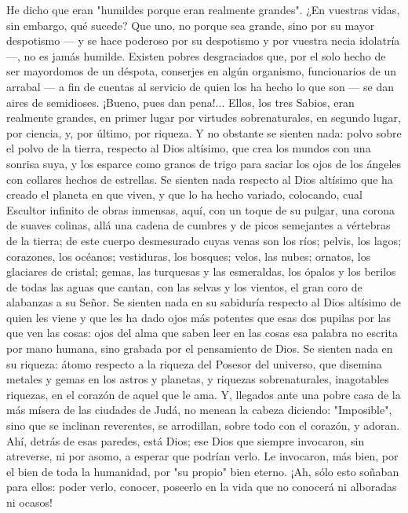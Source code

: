 \documentclass[12pt]{book} %
\begin{document}
He dicho que eran "humildes porque eran realmente grandes". ¿En vuestras vidas, sin embargo, qué sucede? Que uno, no porque sea grande, sino por su mayor despotismo — y se hace poderoso por su despotismo y por vuestra necia idolatría —, no es jamás humilde. Existen pobres desgraciados que, por el solo hecho de ser mayordomos de un déspota, conserjes en algún organismo, funcionarios de un arrabal — a fin de cuentas al servicio de quien los ha hecho lo que son — se dan aires de semidioses. ¡Bueno, pues dan pena!... 
Ellos, los tres Sabios, eran realmente grandes, en primer lugar por virtudes sobrenaturales, en segundo lugar, por 
ciencia, y, por último, por riqueza. Y no obstante se sienten nada: polvo sobre el polvo de la tierra, respecto al Dios altísimo, que crea los mundos con una sonrisa suya, y los esparce como granos de trigo para saciar los ojos de los ángeles con collares hechos de estrellas. 
Se sienten nada respecto al Dios altísimo que ha creado el planeta en que viven, y que lo ha hecho variado, colocando, cual Escultor infinito de obras inmensas, aquí, con un toque de su pulgar, una corona de suaves colinas, allá una cadena de cumbres y de picos semejantes a vértebras de la tierra; de este cuerpo desmesurado cuyas venas son los ríos; pelvis, los lagos; corazones, los océanos; vestiduras, los bosques; velos, las nubes; ornatos, los glaciares de cristal; gemas, las turquesas y las esmeraldas, los ópalos y los berilos de todas las aguas que cantan, con las selvas y los vientos, el gran coro de alabanzas a su Señor. 
Se sienten nada en su sabiduría respecto al Dios altísimo de quien les viene y que les ha dado ojos más potentes que 
esas dos pupilas por las que ven las cosas: ojos del alma que saben leer en las cosas esa palabra no escrita por mano humana, sino grabada por el pensamiento de Dios. 
Se sienten nada en su riqueza: átomo respecto a la riqueza del Posesor del universo, que disemina metales y gemas en 
los astros y planetas, y riquezas sobrenaturales, inagotables riquezas, en el corazón de aquel que le ama. 
Y, llegados ante una pobre casa de la más mísera de las ciudades de Judá, no menean la cabeza diciendo: "Imposible", 
sino que se inclinan reverentes, se arrodillan, sobre todo con el corazón, y adoran. Ahí, detrás de esas paredes, está Dios; ese Dios que siempre invocaron, sin atreverse, ni por asomo, a esperar que podrían verlo. Le invocaron, más bien, por el bien de toda la humanidad, por "su propio" bien eterno. ¡Ah, sólo esto soñaban para ellos: poder verlo, conocer, poseerlo en la vida que no conocerá ni alboradas ni ocasos! 
\end{document}
